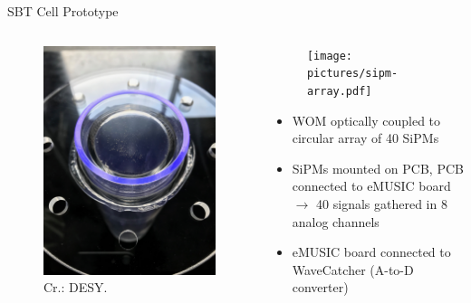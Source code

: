 \documentclass[aspectratio=169]{beamer}
\begin{document}
	\begin{frame}{SBT Cell Prototype}
		\vspace{-1cm}
		\begin{columns}
			
			\begin{column}{0.4\textwidth}
				\begin{figure}
					\centering
					\includegraphics[width=.8\textwidth]{pictures/WOM_Vessel_TB18_top.jpeg}
					\caption{Cr.: DESY.}
				\end{figure}
			\end{column}
			
			
			
			\begin{column}{0.7\textwidth}
				\begin{figure}
					\centering
					\texttt{[image: pictures/sipm-array.pdf]}
				\end{figure}
			
				\begin{itemize}
					\item WOM optically coupled to circular array of 40 SiPMs
					\item SiPMs mounted on PCB, PCB connected to eMUSIC board $\rightarrow$ 40 signals gathered in 8 analog channels
					\item eMUSIC board connected to WaveCatcher (A-to-D converter)
				\end{itemize}
			
			\end{column}
			
			
			
			
			
		\end{columns}
	
	\end{frame}
	
\end{document}
